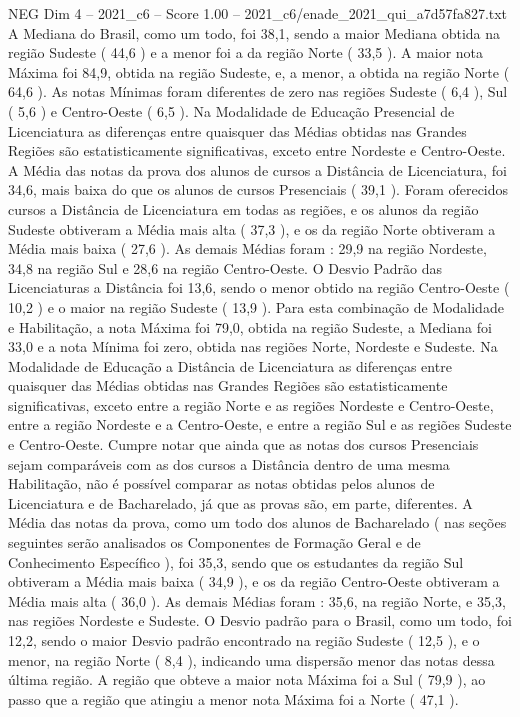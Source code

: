 \begin{textsample}{NEG Dim 4 – 2021\_c6 – Score 1.00 – 2021\_c6/enade\_2021\_qui\_a7d57fa827.txt}
A Mediana do Brasil, como um todo, foi 38,1, sendo a maior Mediana obtida na região Sudeste ( 44,6 ) e a menor foi a da região Norte ( 33,5 ).
A maior nota Máxima foi 84,9, obtida na região Sudeste, e, a menor, a obtida na região Norte ( 64,6 ).
As notas Mínimas foram diferentes de zero nas regiões Sudeste ( 6,4 ), Sul ( 5,6 ) e Centro-Oeste ( 6,5 ).
Na Modalidade de Educação Presencial de Licenciatura as diferenças entre quaisquer das Médias obtidas nas Grandes Regiões são estatisticamente significativas, exceto entre Nordeste e Centro-Oeste.
A Média das notas da prova dos alunos de cursos a Distância de Licenciatura, foi 34,6, mais baixa do que os alunos de cursos Presenciais ( 39,1 ).
Foram oferecidos cursos a Distância de Licenciatura em todas as regiões, e os alunos da região Sudeste obtiveram a Média mais alta ( 37,3 ), e os da região Norte obtiveram a Média mais baixa ( 27,6 ).
As demais Médias foram : 29,9 na região Nordeste, 34,8 na região Sul e 28,6 na região Centro-Oeste.
O Desvio Padrão das Licenciaturas a Distância foi 13,6, sendo o menor obtido na região Centro-Oeste ( 10,2 ) e o maior na região Sudeste ( 13,9 ).
Para esta combinação de Modalidade e Habilitação, a nota Máxima foi 79,0, obtida na região Sudeste, a Mediana foi 33,0 e a nota Mínima foi zero, obtida nas regiões Norte, Nordeste e Sudeste.
Na Modalidade de Educação a Distância de Licenciatura as diferenças entre quaisquer das Médias obtidas nas Grandes Regiões são estatisticamente significativas, exceto entre a região Norte e as regiões Nordeste e Centro-Oeste, entre a região Nordeste e a Centro-Oeste, e entre a região Sul e as regiões Sudeste e Centro-Oeste.
Cumpre notar que ainda que as notas dos cursos Presenciais sejam comparáveis com as dos cursos a Distância dentro de uma mesma Habilitação, não é possível comparar as notas obtidas pelos alunos de Licenciatura e de Bacharelado, já que as provas são, em parte, diferentes.
A Média das notas da prova, como um todo dos alunos de Bacharelado ( nas seções seguintes serão analisados os Componentes de Formação Geral e de Conhecimento Específico ), foi 35,3, sendo que os estudantes da região Sul obtiveram a Média mais baixa ( 34,9 ), e os da região Centro-Oeste obtiveram a Média mais alta ( 36,0 ).
As demais Médias foram : 35,6, na região Norte, e 35,3, nas regiões Nordeste e Sudeste.
O Desvio padrão para o Brasil, como um todo, foi 12,2, sendo o maior Desvio padrão encontrado na região Sudeste ( 12,5 ), e o menor, na região Norte ( 8,4 ), indicando uma dispersão menor das notas dessa última região.
A região que obteve a maior nota Máxima foi a Sul ( 79,9 ), ao passo que a região que atingiu a menor nota Máxima foi a Norte ( 47,1 ).

\end{textsample}
